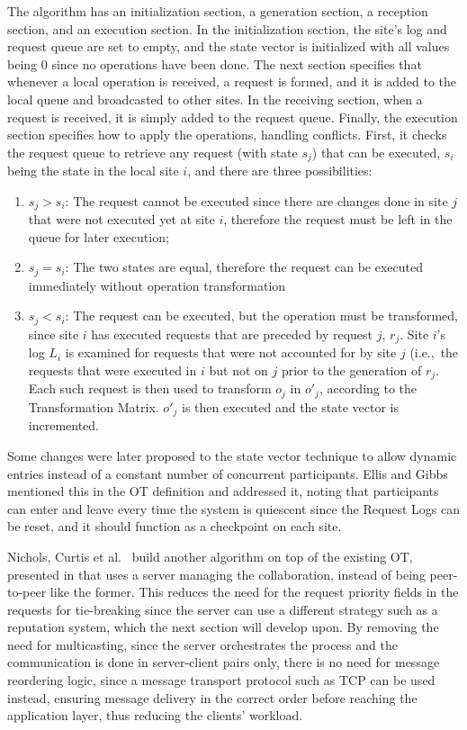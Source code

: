 The algorithm has an initialization section, a generation section, a reception section, and an execution section.
In the initialization section, the site's log and request queue are set to empty, and the state vector is initialized with all values being 0 since no operations have been done. The next section specifies that whenever a local operation is received, a request is formed, and it is added to the local queue and broadcasted to other sites. In the receiving section, when a request is received, it is simply added to the request queue. Finally, the execution section specifies how to apply the operations, handling conflicts. First, it checks the request queue to retrieve any request (with state $s_j$) that can be executed, $s_i$ being the state in the local site $i$, and there are three possibilities:

\begin{enumerate}
    \item $s_j > s_i$: The request cannot be executed since there are changes done in site $j$ that were not executed yet at site $i$, therefore the request must be left in the queue for later execution;
    \item $s_j = s_i$: The two states are equal, therefore the request can be executed immediately without operation transformation
    \item $s_j < s_i$: The request can be executed, but the operation must be transformed, since site $i$ has executed requests that are preceded by request $j$, $r_j$. Site $i$'s log $L_i$ is examined for requests that were not accounted for by site $j$ (i.e.,\ the requests that were executed in $i$ but not on $j$ prior to the generation of $r_j$. Each such request is then used to transform $o_j$ in $o'_j$, according to the Transformation Matrix. $o'_j$ is then executed and the state vector is incremented.
\end{enumerate}

Some changes were later proposed to the state vector technique \cite{Landes2006} \cite{Almeida2008} to allow dynamic entries instead of a constant number of concurrent participants. Ellis and Gibbs \cite{Ellis1989} mentioned this in the OT definition and addressed it, noting that participants can enter and leave every time the system is quiescent since the Request Logs can be reset, and it should function as a checkpoint on each site.

Nichols, Curtis et al.\ \cite{Nichols1995} build another algorithm on top of the existing OT, presented in \cite{Ellis1989} that uses a server managing the collaboration, instead of being peer-to-peer like the former. This reduces the need for the request priority fields in the requests for tie-breaking since the server can use a different strategy such as a reputation system, which the next section will develop upon. By removing the need for multicasting, since the server orchestrates the process and the communication is done in server-client pairs only, there is no need for message reordering logic, since a message transport protocol such as TCP \cite{tcpprotocol} can be used instead, ensuring message delivery in the correct order before reaching the application layer, thus reducing the clients' workload.

